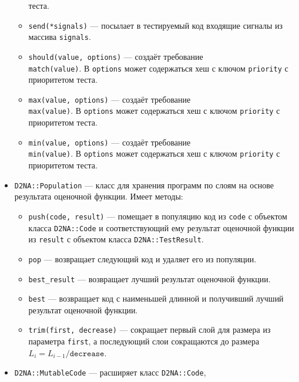 \documentclass[utf8,a5paper,portrait,10pt]{eskdtext}
\begin{document}
\begin{itemize}
\begin{itemize}
                теста.
          \item \texttt{send(*signals)} — посылает в тестируемый код входящие
                сигналы из массива \texttt{signals}.
          \item \texttt{should(value, options)} — создаёт требование\\
                \texttt{match(value)}. В \texttt{options} может содержаться хеш
                с ключом \texttt{priority} с приоритетом теста.
          \item \texttt{max(value, options)} — создаёт требование\\
                \texttt{max(value)}. В \texttt{options} может содержаться хеш
                с ключом \texttt{priority} с приоритетом теста.
          \item \texttt{min(value, options)} — создаёт требование\\
                \texttt{min(value)}. В \texttt{options} может содержаться хеш
                с ключом \texttt{priority} с приоритетом теста.
        \end{itemize}
  \item \texttt{D2NA::Population} — класс для хранения программ по слоям на
        основе результата оценочной функции. Имеет методы:
        \begin{itemize}
          \item \texttt{push(code, result)} — помещает в популяцию код из
                \texttt{code} с объектом класса \texttt{D2NA::Code} и
                соответствующий ему результат оценочной функции из
                \texttt{result} с объектом класса \texttt{D2NA::TestResult}.
          \item \texttt{pop} — возвращает следующий код и удаляет его из
                популяции.
          \item \texttt{best\_result} — возвращает лучший результат оценочной
                функции.
          \item \texttt{best} — возвращает код с наименьшей длинной и получивший
                лучший результат оценочной функции.
          \item \texttt{trim(first, decrease)} — сокращает первый слой для
                размера из параметра \texttt{first}, а последующий слои
                сокращаются до размера\\ $L_i = L_{i-1} / \texttt{decrease}$.
        \end{itemize}
 \item \texttt{D2NA::MutableCode} — расширяет класс \texttt{D2NA::Code},

\end{itemize}
\end{document}
